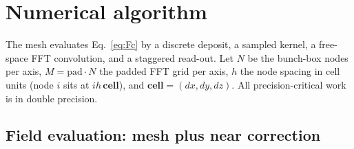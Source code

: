 \section{Numerical algorithm}
\label{sec:method}

The mesh evaluates Eq.~\eqref{eq:Fc} by a discrete deposit, a sampled
kernel, a free-space FFT convolution, and a staggered read-out. Let $N$ be
the bunch-box nodes per axis, $M=\mathrm{pad}\cdot N$ the padded FFT grid
per axis, $h$ the node spacing in cell units (node $i$ sits at
$i h\,\mathbf{cell}$), and $\mathbf{cell}=(dx,dy,dz)$. All precision-critical
work is in double precision.

\subsection{Field evaluation: mesh plus near correction}
\label{sec:pipeline}

